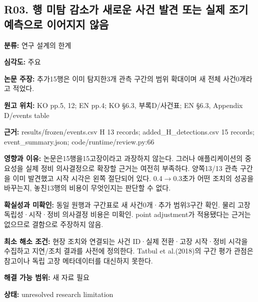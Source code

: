 \documentclass[11pt,a4paper]{article}
\begin{document}
\subsection*{R03. 행 미탐 감소가 새로운 사건 발견 또는 실제 조기예측으로 이어지지 않음}
\textbf{분류:} 연구 설계의 한계
\par
\textbf{심각도:} 주요
\par
\textbf{논문 주장:} 추가15행은 이미 탐지한3개 관측 구간의 범위 확대이며 새 전체 사건0개라고 적었다.
\par
\textbf{원고 위치:} KO pp.5, 12; EN pp.4; KO §6.3, 부록D/사건표; EN §6.3, Appendix D/events table
\par
\textbf{근거:} results/frozen/events.csv H 13 records; added\_H\_detections.csv 15 records; event\_summary.json; code/runtime/review.py:66
\par
\textbf{영향과 이유:} 논문은15행을15고장이라고 과장하지 않는다. 그러나 애플리케이션의 중요성을 실제 정비 의사결정으로 확장할 근거는 여전히 부족하다. 양쪽13/13 관측 구간을 이미 발견했고 시작 시각은 왼쪽 절단되어 있다. 0.4$\to$0.3초가 어떤 조치의 성공을 바꾸는지, 놓친13행의 비용이 무엇인지는 판단할 수 없다.
\par
\textbf{확실성과 미확인:} 동일 원행과 구간표로 새 사건0개·추가 범위3구간 확인. 물리 고장 독립성·시작·정비 의사결정 비용은 미확인. point adjustment가 적용됐다는 근거는 없으므로 결함으로 주장하지 않음.
\par
\textbf{최소 해소 조건:} 현장 조치와 연결되는 사건 ID·실제 전환·고장 시작·정비 시각을 수집하고 지연/조치 결과를 사전에 정의한다. Tatbul et al.(2018)의 구간 평가 관점은 참고이나 독립 고장 메타데이터를 대신하지 못한다.
\par
\textbf{해결 가능 범위:} 새 자료 필요
\par
\textbf{상태:} unresolved research limitation
\par
\end{document}
